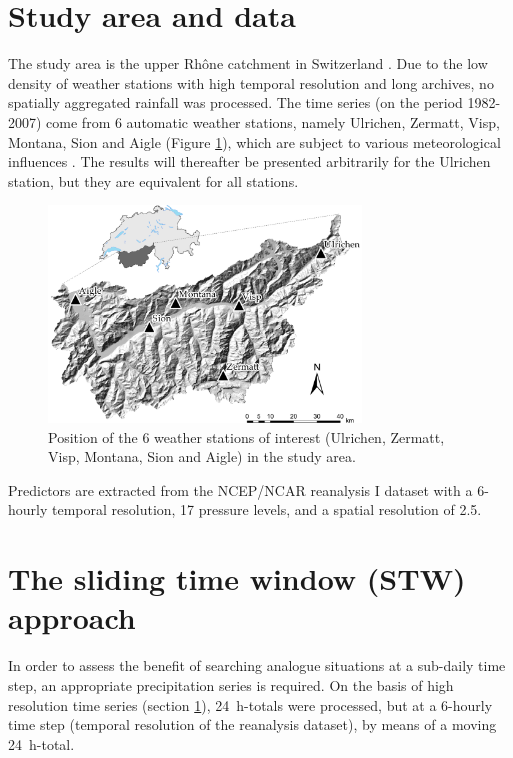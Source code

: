 \documentclass[hess]{copernicus}
\begin{document}
\section{Study area and data}
\label{sec:data}

The study area is the upper Rh\^{o}ne catchment in Switzerland \cite[see also][]{Horton2012a}. Due to the low density of weather stations with high temporal resolution and long archives, no spatially aggregated rainfall was processed. The time series (on the period 1982-2007) come from 6 automatic weather stations, namely Ulrichen, Zermatt, Visp, Montana, Sion and Aigle (Figure \ref{fig:map}), which are subject to various meteorological influences \citep{Horton2012}. The results will thereafter be presented arbitrarily for the Ulrichen station, but they are equivalent for all stations.

\begin{figure}[htb]
	\begin{center}
		\includegraphics[width=8.3cm]{figures/figure_map.pdf}
	\end{center}
	\caption{Position of the 6 weather stations of interest (Ulrichen, Zermatt, Visp, Montana, Sion and Aigle) in the study area.}
	\label{fig:map}
\end{figure}

Predictors are extracted from the NCEP/NCAR reanalysis I \citep{Kalnay1996} dataset with a 6-hourly temporal resolution, 17 pressure levels, and a spatial resolution of 2.5\degree.




\section{The sliding time window (STW) approach}
\label{sec:method}

In order to assess the benefit of searching analogue situations at a sub-daily time step, an appropriate precipitation series is required. On the basis of high resolution time series (section \ref{sec:data}), 24~h-totals were processed, but at a 6-hourly time step (temporal resolution of the reanalysis dataset), by means of a moving 24~h-total. 
\end{document}
